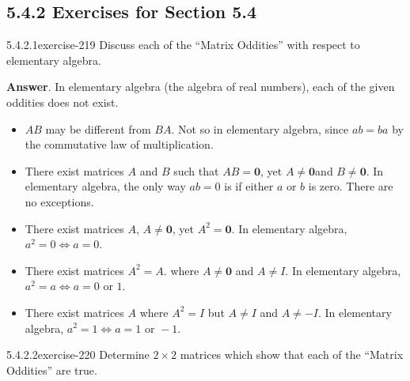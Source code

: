 \documentclass[twoside,10pt,]{book}
\numberwithin{equation}{section}
\begin{document}
\subsection*{5.4.2 Exercises for Section 5.4}
\begin{divisionsolution}{5.4.2.1}{}{exercise-219}%
\hypertarget{p-1897}{}%
Discuss each of the ``Matrix Oddities'' with respect to elementary algebra.%
\par\smallskip%
\noindent\textbf{Answer}.\quad%
\hypertarget{p-1898}{}%
In elementary algebra (the algebra of real numbers), each of the given oddities does not exist.%
\par
\hypertarget{p-1899}{}%
\leavevmode%
\begin{itemize}[label=\textbullet]
\item{}\hypertarget{p-1900}{}%
\(AB\) may be different from \(BA\). Not so in elementary algebra, since \(a b = b a\) by the commutative law of multiplication.%
\item{}\hypertarget{p-1901}{}%
There exist matrices \(A\) and \(B\) such that \(AB = \pmb{0}\), yet \(A\neq \pmb{0}\)and \(B\neq \pmb{0}\). In elementary algebra, the only way \(ab = 0\)  is if either \(a\) or \(b\) is zero. There are no exceptions.%
\item{}\hypertarget{p-1902}{}%
There exist matrices \(A\), \(A\neq \pmb{0}\), yet \(A^2=\pmb{0}\). In elementary algebra, \(a^2=0\Leftrightarrow a=0\).%
\item{}\hypertarget{p-1903}{}%
There exist matrices \(A^2=A\). where \(A\neq \pmb{0}\) and \(A\neq I\). In elementary algebra, \(a^2=a\Leftrightarrow a=0 \textrm{ or } 1\).%
\item{}\hypertarget{p-1904}{}%
There exist matrices \(A\) where \(A^2=I\) but \(A\neq I\) and \(A\neq -I\). In elementary algebra, \(a^2=1\Leftrightarrow a=1\textrm{ or 	}-1\).%
\end{itemize}
%
\end{divisionsolution}%
\begin{divisionsolution}{5.4.2.2}{}{exercise-220}%
\hypertarget{p-1905}{}%
Determine \(2\times 2\) matrices which show that each of the ``Matrix Oddities'' are true.%
\end{divisionsolution}%
\end{document}
